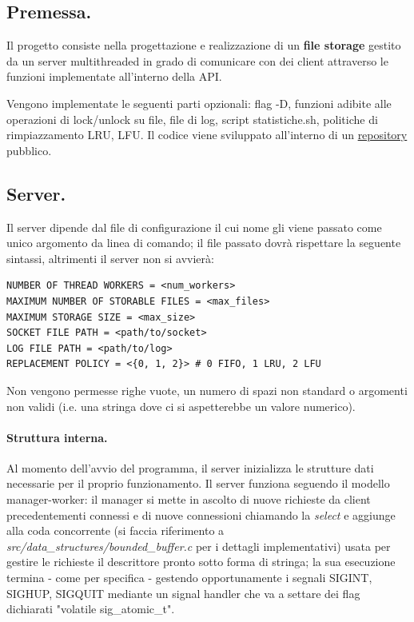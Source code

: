 \documentclass[11pt, italian, openany]{book}
\begin{document}
\begin{sloppypar}
\subsection{Premessa.}
Il progetto consiste nella progettazione e realizzazione di un \textbf{file storage} gestito da un server multithreaded in grado
di comunicare con dei client attraverso le funzioni implementate all'interno della API.

Vengono implementate le seguenti parti opzionali: flag -D, funzioni adibite alle operazioni di lock/unlock su file,
file di log, script statistiche.sh, politiche di rimpiazzamento LRU, LFU. Il codice viene sviluppato all'interno di un
\href{https://github.com/liviusi/SOL-Progetto-20-21}{repository} pubblico.

\subsection{Server.}
Il server dipende dal file di configurazione il cui nome gli viene passato come unico argomento da linea di comando;
il file passato dovr\`a rispettare la seguente sintassi, altrimenti il server non si avvier\`a:
\begin{lstlisting}[style=code]
NUMBER OF THREAD WORKERS = <num_workers>
MAXIMUM NUMBER OF STORABLE FILES = <max_files>
MAXIMUM STORAGE SIZE = <max_size>
SOCKET FILE PATH = <path/to/socket>
LOG FILE PATH = <path/to/log>
REPLACEMENT POLICY = <{0, 1, 2}> # 0 FIFO, 1 LRU, 2 LFU
\end{lstlisting}
Non vengono permesse righe vuote, un numero di spazi non standard o argomenti non validi (i.e. una stringa dove ci si aspetterebbe
un valore numerico).

\paragraph*{Struttura interna.}
Al momento dell'avvio del programma, il server inizializza le strutture dati necessarie per il proprio
funzionamento. Il server funziona seguendo il modello manager-worker: il manager si mette in ascolto di nuove richieste da client
precedentementi connessi e di nuove connessioni chiamando la \textit{select} e aggiunge alla coda concorrente (si faccia
riferimento a \textit{src/data\_structures/bounded\_buffer.c} per i dettagli implementativi) usata per gestire le
richieste il descrittore pronto sotto forma di stringa; la sua esecuzione termina - come per specifica - gestendo opportunamente
i segnali SIGINT, SIGHUP, SIGQUIT mediante un signal handler che va a settare dei flag dichiarati "volatile sig\_atomic\_t".


\end{sloppypar}
\end{document}
